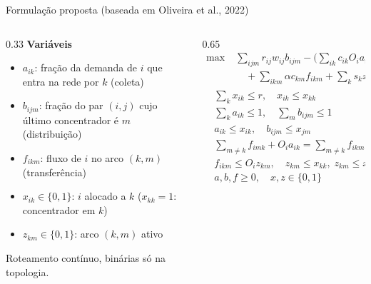 \documentclass[aspectratio=169, 10pt]{beamer}
\begin{document}
\begin{frame}{Formulação proposta {\normalsize(baseada em Oliveira et al., 2022)}}
  \begin{columns}[T]
    \begin{column}{0.33\textwidth}
      \footnotesize
      \textbf{Variáveis}
      \begin{itemize}
        \item $a_{ik}$: fração da demanda de $i$ que entra na rede por $k$ \hfill\alert{(coleta)}
        \item $b_{ijm}$: fração do par $(i,j)$ cujo último concentrador é $m$ \hfill\alert{(distribuição)}
        \item $f_{ikm}$: fluxo de $i$ no arco $(k,m)$ \hfill\alert{(transferência)}
        \item $x_{ik}\in\{0,1\}$: $i$ alocado a $k$ ($x_{kk}=1$: concentrador em $k$)
        \item $z_{km}\in\{0,1\}$: arco $(k,m)$ ativo
      \end{itemize}
      \vspace{0.1cm}
      Roteamento \alert{contínuo}, binárias só na topologia.
    \end{column}
    \begin{column}{0.65\textwidth}
      \footnotesize
      \begin{align*}
        \max\; & \textstyle\sum_{ijm} r_{ij}w_{ij}b_{ijm} - \Big(\sum_{ik} c_{ik}O_ia_{ik} + \sum_{ijm} c_{mj}w_{ij}b_{ijm}\\[-2pt]
        & \textstyle\quad + \sum_{ikm}\alpha c_{km}f_{ikm} + \sum_k s_kx_{kk} + \sum_{k\neq m} g_{km}z_{km}\Big)
      \end{align*}
      \vspace{-0.5cm}
      \begin{align*}
        & \textstyle\sum_k x_{ik} \le r, \quad x_{ik}\le x_{kk} && \text{alocação}\\
        & \textstyle\sum_k a_{ik}\le 1, \quad \sum_m b_{ijm}\le 1 && \text{máx. 100\%}\\
        & a_{ik}\le x_{ik}, \quad b_{ijm}\le x_{jm} && \text{via alocados}\\
        & \textstyle\sum_{m\neq k} f_{imk} + O_ia_{ik} = \sum_{m\neq k} f_{ikm} + \sum_j w_{ij}b_{ijk} && \text{conservação}\\
        & f_{ikm}\le O_iz_{km}, \quad z_{km}\le x_{kk},\; z_{km}\le x_{mm} && \text{arcos}\\
        & a,b,f\ge 0, \quad x,z\in\{0,1\}
      \end{align*}
    \end{column}
  \end{columns}
\end{frame}
\end{document}
